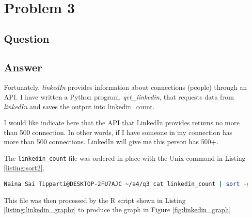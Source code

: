 \section{Problem 3}

\subsection{Question}
\vspace*{10pt}


\subsection{Answer}
Fortunately, {\it linkedIn} provides information about connections (people) through an API\cite{linkedin}. I have written a Python program,
{\it qet\_linkedin}, that requests\cite{oauth2} data from {\it linkedIn} and saves the output into linkedin\_count.
\vspace{3mm}

\clearpage
\vspace{2mm}
I would like indicate here that the API that LinkedIn provides returns no more than 500 connection. In other words, if I have someone in my connection has more than 500 connections. LinkedIn will give me this person has 500+.

The {\tt linkedin\_count} file was ordered in place with the Unix command in Listing \ref{listing:sort2}. 
\vspace{2mm}
\begin{lstlisting}[language=Bash,caption={Sort command},label=listing:sort2]
Naina Sai Tipparti@DESKTOP-2FU7AJC ~/a4/q3 cat linkedin_count | sort -g -o linkedin_count
\end{lstlisting}
\vspace{2mm}
This file was then processed by the R script shown in Listing \ref{listing:linkedin_graphr} to produce the graph in Figure \ref{fig:linkedin_graph}

